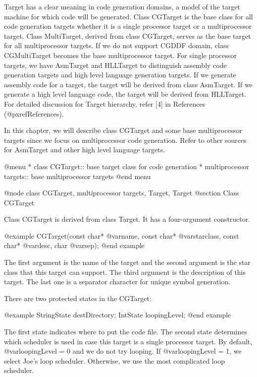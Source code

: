 Target has a clear meaning in code generation domains, a model of
the target machine for which code will be generated. Class CGTarget is the
base class for all code generation targets whether it is a single
processor target or a multiprocessor target. Class MultiTarget,
derived from class CGTarget, serves as the base target for all
multiprocessor targets. If we do not support CGDDF domain, class
CGMultiTarget becomes the base multiprocessor target. For
single processor targets, we have AsmTarget and HLLTarget to distinguish
assembly code generation targets and high level language generation targets.
If we generate assembly code for a target, the target will be derived from
class AsmTarget. If we generate a high level language code, the target
will be derived from HLLTarget. For detailed discussion for Target
hierarchy, refer [4] in References (@pxref{References}).

In this chapter, we will describe class CGTarget and some base multiprocessor
targets since we focus on multiprocessor code generation. Refer to
other sources for AsmTarget and other high level language targets.
 
@menu
* class CGTarget::			base target class for code generation
* multiprocessor targets::		base multiprocessor targets
@end menu

@node class CGTarget, multiprocessor targets, Target, Target
@section Class CGTarget

Class CGTarget is derived from class Target. It has a four-argument
constructor.

@example
CGTarget(const char* @var{name}, const char* @var{starclass}, const char* @var{desc}, char @var{sep});
@end example

The first argument is the name of the target and the second argument is the
star class that this target can support. The third argument is the description
of this target. The last one is a separator character for unique symbol
generation.

There are two protected states in the CGTarget:

@example
StringState destDirectory;
IntState loopingLevel;
@end example

The first state indicates where to put the code file. The second state
determines which scheduler is used in case this target is a single
processor target. By default, @var{loopingLevel} = 0 and we do not
try looping. If @var{loopingLevel} = 1, we select Joe's loop scheduler.
Otherwise, we use the most complicated loop scheduler.

